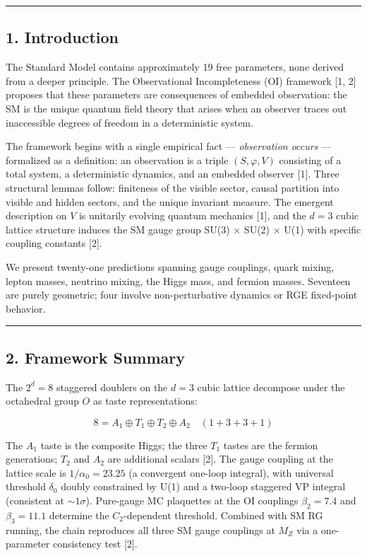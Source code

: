 \documentclass[
  11pt,
]{article}
\begin{document}
\begin{center}\rule{0.5\linewidth}{0.5pt}\end{center}

\hypertarget{introduction}{%
\subsection{1. Introduction}\label{introduction}}

The Standard Model contains approximately 19 free parameters, none
derived from a deeper principle. The Observational Incompleteness (OI)
framework {[}1, 2{]} proposes that these parameters are consequences of
embedded observation: the SM is the unique quantum field theory that
arises when an observer traces out inaccessible degrees of freedom in a
deterministic system.

The framework begins with a single empirical fact --- \emph{observation
occurs} --- formalized as a definition: an observation is a triple
\((S, \varphi, V)\) consisting of a total system, a deterministic
dynamics, and an embedded observer {[}1{]}. Three structural lemmas
follow: finiteness of the visible sector, causal partition into visible
and hidden sectors, and the unique invariant measure. The emergent
description on \(V\) is unitarily evolving quantum mechanics {[}1{]},
and the \(d = 3\) cubic lattice structure induces the SM gauge group
SU(3) \(\times\) SU(2) \(\times\) U(1) with specific coupling constants
{[}2{]}.

We present twenty-one predictions spanning gauge couplings, quark
mixing, lepton masses, neutrino mixing, the Higgs mass, and fermion
masses. Seventeen are purely geometric; four involve non-perturbative
dynamics or RGE fixed-point behavior.

\begin{center}\rule{0.5\linewidth}{0.5pt}\end{center}

\hypertarget{framework-summary}{%
\subsection{2. Framework Summary}\label{framework-summary}}

The \(2^d = 8\) staggered doublers on the \(d = 3\) cubic lattice
decompose under the octahedral group \(O\) as taste representations:

\[8 = A_1 \oplus T_1 \oplus T_2 \oplus A_2 \quad (1 + 3 + 3 + 1)\]

The \(A_1\) taste is the composite Higgs; the three \(T_1\) tastes are
the fermion generations; \(T_2\) and \(A_2\) are additional scalars
{[}2{]}. The gauge coupling at the lattice scale is
\(1/\alpha_0 = 23.25\) (a convergent one-loop integral), with universal
threshold \(\delta_0\) doubly constrained by U(1) and a two-loop
staggered VP integral (consistent at \(\sim 1\sigma\)). Pure-gauge MC
plaquettes at the OI couplings \(\beta_2 = 7.4\) and \(\beta_3 = 11.1\)
determine the \(C_2\)-dependent threshold. Combined with SM RG running,
the chain reproduces all three SM gauge couplings at \(M_Z\) via a
one-parameter consistency test {[}2{]}.
\end{document}
